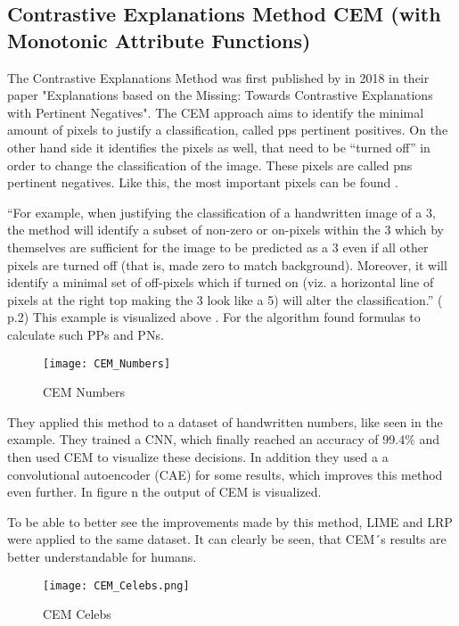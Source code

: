 \subsection{Contrastive Explanations Method CEM (with Monotonic Attribute Functions)}
The Contrastive Explanations Method was first published by  in 2018 in their paper "Explanations based on the Missing: Towards Contrastive Explanations with Pertinent Negatives".
The CEM approach aims to identify the minimal amount of pixels to justify a classification, called \glspl{pp} pertinent positives. On the other hand side it identifies the pixels as well, that need to be “turned off” in order to change the classification of the image. These pixels are called \glspl{pn} pertinent negatives. Like this, the most important pixels can be found . 
\par
“For example, when justifying the classification of a handwritten image of a 3, the method will identify a subset of non-zero or on-pixels within the 3 which by themselves are sufficient for the image to be predicted as a 3 even if all other pixels are turned off (that is, made zero to match background). Moreover, it will identify a minimal set of off-pixels which if turned on (viz. a horizontal line of pixels at the right top making the 3 look like a 5) will alter the classification.” ( p.2)
This example is visualized above .
For the algorithm  found formulas to calculate such PPs and PNs.
\begin{figure*}
    \center
    \texttt{[image: CEM\_Numbers]}
    \caption{CEM Numbers}
\end{figure*}
They applied this method to a dataset of handwritten numbers, like seen in the example. They trained a CNN, which finally reached an accuracy of 99.4\% and then used CEM to visualize these decisions. In addition they used a a convolutional autoencoder (CAE) for some results, which improves this method even further. In figure n the output of CEM is visualized. 
\par
To be able to better see the improvements made by this method, LIME and LRP were applied to the same dataset. It can clearly be seen, that CEM´s results are better understandable for humans.
\begin{figure*}
    \center
    \texttt{[image: CEM\_Celebs.png]}
    \caption{CEM Celebs}
\end{figure*}

